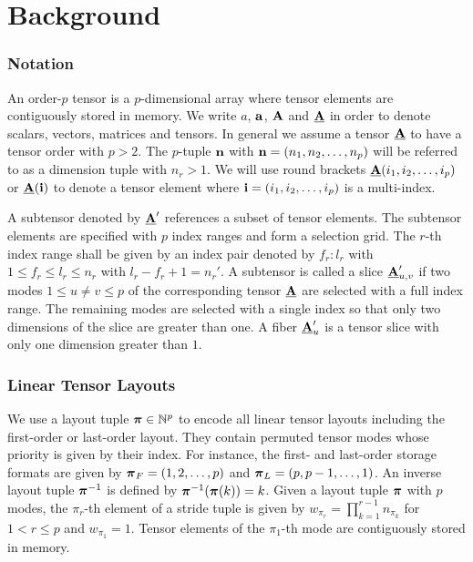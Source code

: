 \section{Background}
\label{sec:preliminaries}

\subsubsection{Notation}
\label{sec:preliminaries:notation}
An order-$p$ tensor is a $p$-dimensional array \cite{lim:2017:hypermatrices} where tensor elements are contiguously stored in memory. %
We write $a$, $\mathbf{a}$, $\mathbf{A}$ and $\underline{\mathbf{A}}$ in order to denote scalars, vectors, matrices and tensors. 
In general we assume a tensor $\underline{\mathbf{A}}$ to have a tensor order with $p>2$.
The $p$-tuple $\mathbf{n}$ with $\mathbf{n} = (n_1,n_2,\dots,n_p)$ will be referred to as a dimension tuple with $n_r>1$.
We will use round brackets $\underline{\mathbf{A}}(i_1,i_2,\dots,i_p)$ or $\underline{\mathbf{A}}(\mathbf{i})$ to denote a tensor element where $\mathbf{i} = (i_1,i_2,\dots,i_p)$ is a multi-index.

A subtensor denoted by $\underline{\mathbf{A}}'$ references a subset of tensor elements.
The subtensor elements are specified with $p$ index ranges and form a selection grid.
The $r$-th index range shall be given by an index pair denoted by $f_r \colon l_r$ with $1 \leq f_r \leq l_r \leq n_r$ with $l_r - f_r + 1 = n_r'$.
A subtensor is called a slice $\underline{\mathbf{A}}_{u,v}'$ if two modes $1 \leq u \neq v \leq p$ of the corresponding tensor $\underline{\mathbf{A}}$ are selected with a full index range.
The remaining modes are selected with a single index so that only two dimensions of the slice are greater than one.
A fiber $\underline{\mathbf{A}}_u'$ is a tensor slice with only one dimension greater than $1$.


\subsubsection{Linear Tensor Layouts}
\label{sec:preliminaries:layout}
We use a layout tuple $\boldsymbol{\pi} \in \mathbb{N}^p$ to encode all linear tensor layouts including the first-order or last-order layout.
They contain permuted tensor modes whose priority is given by their index.
For instance, the first- and last-order storage formats are given by $\boldsymbol{\pi}_F = (1,2,\dots,p)$ and $\boldsymbol{\pi}_{L} = (p,p-1,\dots,1)$.
An inverse layout tuple $\boldsymbol{\pi}^{-1}$ is defined by $\boldsymbol{\pi}^{-1}(\boldsymbol{\pi}(k)) = k$.
Given a layout tuple $\boldsymbol{\pi}$ with $p$ modes, the $\pi_r$-th element of a stride tuple is given by $w_{\pi_r} = \prod_{k=1}^{r-1} n_{\pi_k}$ for $1 < r \leq p$ and $w_{\pi_1} = 1$.
Tensor elements of the $\pi_1$-th mode are contiguously stored in memory.

